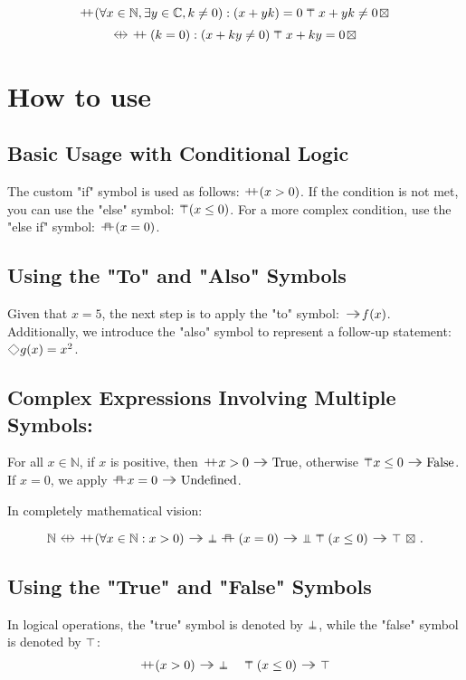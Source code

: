 \documentclass{iac}
\begin{document}
$$ \ifL (\forall x \in \mathbb{N}, \exists y \in \mathbb{C}, k\not= 0) : (x + yk) = 0 \elseL x + yk \not= 0 \doneL$$
$$ \logicalEquL \ifL (k = 0) : (x + ky \not= 0) \elseL x + ky = 0 \doneL $$

\section{How to use}

\subsection{Basic Usage with Conditional Logic}

The custom "if" symbol is used as follows: $\ifL (x > 0)$. 
If the condition is not met, you can use the "else" symbol: $\elseL (x \leq 0)$.
For a more complex condition, use the "else if" symbol: $\elifL (x = 0)$.

\subsection{Using the "To" and "Also" Symbols}

Given that $x = 5$, the next step is to apply the "to" symbol: $\toL f(x)$.
Additionally, we introduce the "also" symbol to represent a follow-up statement: 
$\alsoL g(x) = x^2$.

\subsection{Complex Expressions Involving Multiple Symbols:}

For all $x \in \mathbb{N}$, if $x$ is positive, then $\ifL x > 0 \toL \text{True}$, 
otherwise $\elseL x \leq 0 \toL \text{False}$.
If $x = 0$, we apply $\elifL x = 0 \toL \text{Undefined}$.

In completely mathematical vision:

$$ \mathbb{N} \logicalEquL \ifL (\forall x \in \mathbb{N} : x > 0) \toL \trueL \elifL (x = 0) \toL \undefinedL \elseL (x \leq 0) \toL \falseL \doneL. $$

\subsection{Using the "True" and "False" Symbols}

In logical operations, the "true" symbol is denoted by $\trueL$, while the "false" symbol is denoted by $\falseL$:
$$\ifL (x > 0) \toL \trueL \quad \elseL (x \leq 0) \toL \falseL$$
\end{document}
